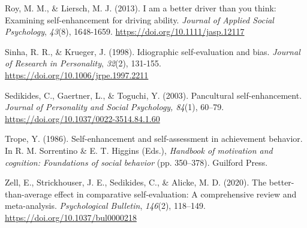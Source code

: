 \documentclass[authordate, anecdote]{jote-new-article}
\begin{document}
	Roy, M. M., \& Liersch, M. J. (2013). I am a better driver than you think: Examining self-enhancement for driving ability. \emph{Journal of Applied Social Psychology}, \emph{43}(8), 1648-1659. \url{https://doi.org/10.1111/jasp.12117}



	Sinha, R. R., \& Krueger, J. (1998). Idiographic self-evaluation and bias. \emph{Journal of Research in Personality}, \emph{32}(2), 131-155. \url{https://doi.org/10.1006/jrpe.1997.2211}



	Sedikides, C., Gaertner, L., \& Toguchi, Y. (2003). Pancultural self-enhancement. \emph{Journal of Personality and Social Psychology, 84}(1), 60--79. \url{https://doi.org/10.1037/0022-3514.84.1.60}



	Trope, Y. (1986). Self-enhancement and self-assessment in achievement behavior. In R. M. Sorrentino \& E. T. Higgins (Eds.), \emph{Handbook of motivation and cognition: Foundations of social behavior} (pp. 350--378). Guilford Press.



	Zell, E., Strickhouser, J. E., Sedikides, C., \& Alicke, M. D. (2020). The better-than-average effect in comparative self-evaluation: A comprehensive review and meta-analysis. \emph{Psychological Bulletin}, \emph{146}(2), 118--149. \url{https://doi.org/10.1037/bul0000218}
\end{document}
